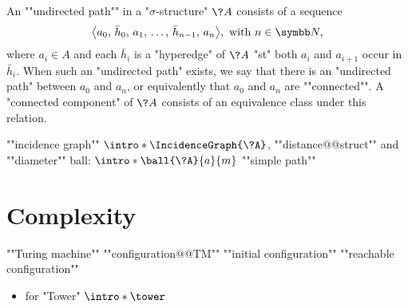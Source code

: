An \AP""undirected path"" in a "$\sigma$-structure" $\?A$ consists of a sequence
\[\big\langle a_0,\, \bar h_0,\, a_1,\, \dotsc,\, \bar h_{n-1},\, a_n\big\rangle, \text{ with } n \in \N,\]
where $a_i \in A$ and each $\bar h_i$ is a "hyperedge" of $\?A$ "st" both
$a_i$ and $a_{i+1}$ occur in $\bar h_i$. When such an "undirected path" exists, we say that
there is an "undirected path" between $a_0$ and $a_n$, or equivalently
that $a_0$ and $a_n$ are \AP""connected"".%
A \AP"connected component" of $\?A$ consists of an equivalence class under this relation.

\begin{itemize}
	\itemAP ""incidence graph"" $\intro*\IncidenceGraph{\?A}$, ""distance@@struct"" and ""diameter""
	\itemAP ball: $\intro*\ball{\?A}{a}{m}$
	\itemAP ""simple path""
\end{itemize}

\section{Complexity}

\begin{itemize}
	\itemAP ""Turing machine""
	\itemAP ""configuration@@TM""
	\itemAP ""initial configuration""
	\itemAP ""reachable configuration""
\end{itemize}

\begin{itemize}
	\itemAP ""Connectivity in Finite Graphs""
	\itemAP ""Reachability in Finite Graphs""
	\itemAP ""computationally equivalent""
	\itemAP ""data complexity""
	\item \cite{Schmitz2016ComplexityHierarchies} for "Tower" $\intro*\tower$
\end{itemize}
